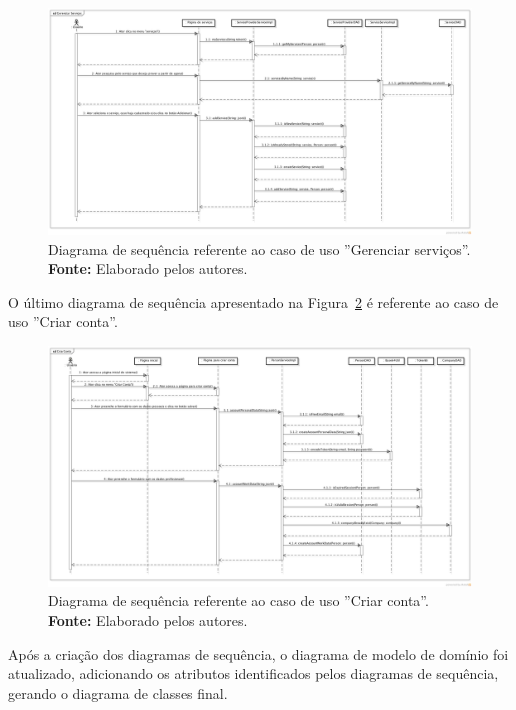 \begin{landscape}
\newpage
\captionsetup[figure]{list=no}
\begin{figure}[h!]
	\centerline{\includegraphics[scale=0.4]{./imagens/apendices/diagrama-sequencia-gerenciar-servicos.png}}
	\caption[Diagrama de sequência referente ao caso de uso ''Gerenciar serviços''.]
	{Diagrama de sequência referente ao caso de uso ''Gerenciar serviços''. \textbf{Fonte:} Elaborado pelos autores.}
	\label{fig:ap1:diagrama_sequencia_gerenciar_servicos}
\end{figure}

O último diagrama de sequência apresentado na Figura~\ref{fig:ap1:diagrama_sequencia_criar_conta} é referente ao caso de uso ''Criar conta''.

\newpage
\captionsetup[figure]{list=no}
\begin{figure}[h!]
	\centerline{\includegraphics[scale=0.4]{./imagens/apendices/diagrama-sequencia-criar-conta.png}}
	\caption[Diagrama de sequência referente ao caso de uso ''Criar conta''.]
	{Diagrama de sequência referente ao caso de uso ''Criar conta''. \textbf{Fonte:} Elaborado pelos autores.}
	\label{fig:ap1:diagrama_sequencia_criar_conta}
\end{figure}
\end{landscape}

Após a criação dos diagramas de sequência, o diagrama de modelo de domínio foi atualizado, adicionando os atributos identificados pelos diagramas de sequência, gerando o diagrama de classes final.
